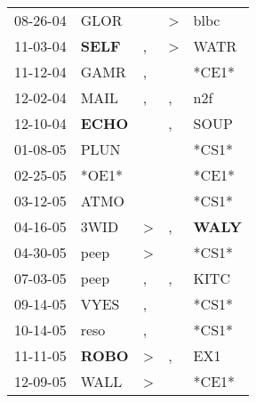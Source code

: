 \begin{supertabular}{p{0.07\textwidth}p{0.06\textwidth}p{0.02\textwidth}p{0.02\textwidth}p{0.06\textwidth}}
 08-26-04\textsuperscript{} &           GLOR\textsuperscript{} &               &  \textgreater &           blbc\textsuperscript{} \\
 11-03-04\textsuperscript{} &  \textbf{SELF\textsuperscript{}} &             , &  \textgreater &           WATR\textsuperscript{} \\
 11-12-04\textsuperscript{} &           GAMR\textsuperscript{} &             , &               &                            *CE1* \\
 12-02-04\textsuperscript{} &           MAIL\textsuperscript{} &             , &             , &            n2f\textsuperscript{} \\
 12-10-04\textsuperscript{} &  \textbf{ECHO\textsuperscript{}} &               &             , &           SOUP\textsuperscript{} \\
 01-08-05\textsuperscript{} &           PLUN\textsuperscript{} &               &               &                            *CS1* \\
 02-25-05\textsuperscript{} &                            *OE1* &               &               &                            *CE1* \\
 03-12-05\textsuperscript{} &           ATMO\textsuperscript{} &               &               &                            *CS1* \\
 04-16-05\textsuperscript{} &           3WID\textsuperscript{} &  \textgreater &             , &  \textbf{WALY\textsuperscript{}} \\
 04-30-05\textsuperscript{} &           peep\textsuperscript{} &  \textgreater &               &                            *CS1* \\
 07-03-05\textsuperscript{} &           peep\textsuperscript{} &             , &             , &           KITC\textsuperscript{} \\
 09-14-05\textsuperscript{} &           VYES\textsuperscript{} &             , &               &                            *CS1* \\
 10-14-05\textsuperscript{} &           reso\textsuperscript{} &             , &               &                            *CS1* \\
 11-11-05\textsuperscript{} &  \textbf{ROBO\textsuperscript{}} &  \textgreater &             , &            EX1\textsuperscript{} \\
 12-09-05\textsuperscript{} &           WALL\textsuperscript{} &  \textgreater &               &                            *CE1* \\

\end{supertabular}
